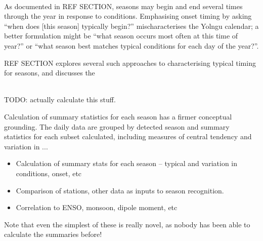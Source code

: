~\\

As documented in REF SECTION, seasons may begin and end several
times through the year in response to conditions.  Emphasising onset timing
by asking ``when does [this season] typically begin?'' mischaracterises the
Yolngu calendar; a better formulation might be ``what season occurs most
often at this time of year?'' or ``what season best matches typical conditions
for each day of the year?''.

REF SECTION explores several such approaches to characterising typical
timing for seasons, and discusses the 


~\\

TODO: actually calculate this stuff.

Calculation of summary statistics for each season has a firmer conceptual
grounding.  The daily data are grouped by detected season and summary statistics
for each subset calculated, including measures of central tendency and
variation in ... 
\begin{itemize}
\item Calculation of summary stats for each season – typical and variation in conditions, onset, etc
\item Comparison of stations, other data as inputs to season recognition.
\item Correlation to ENSO, monsoon, dipole moment, etc
\end{itemize}

Note that even the simplest of these is really novel, as nobody has
been able to calculate the summaries before!
















